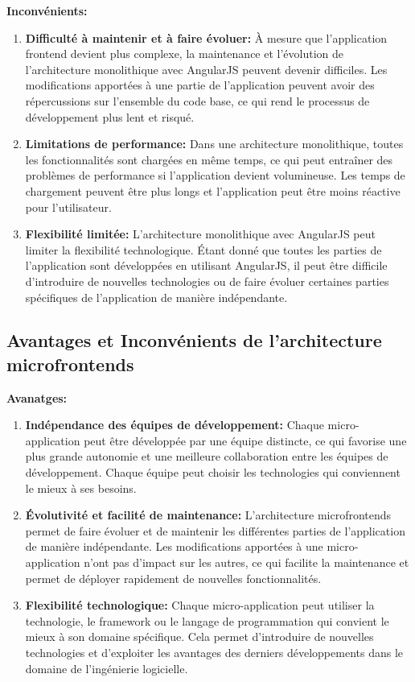 \textbf{Inconvénients:}
\begin{enumerate}
    \item \textbf{Difficulté à maintenir et à faire évoluer:} À mesure que l'application frontend devient plus complexe, la maintenance et l'évolution de l'architecture monolithique avec AngularJS peuvent devenir difficiles. Les modifications apportées à une partie de l'application peuvent avoir des répercussions sur l'ensemble du code base, ce qui rend le processus de développement plus lent et risqué.
    \item \textbf{Limitations de performance:} Dans une architecture monolithique, toutes les fonctionnalités sont chargées en même temps, ce qui peut entraîner des problèmes de performance si l'application devient volumineuse. Les temps de chargement peuvent être plus longs et l'application peut être moins réactive pour l'utilisateur.
    \item \textbf{Flexibilité limitée:} L'architecture monolithique avec AngularJS peut limiter la flexibilité technologique. Étant donné que toutes les parties de l'application sont développées en utilisant AngularJS, il peut être difficile d'introduire de nouvelles technologies ou de faire évoluer certaines parties spécifiques de l'application de manière indépendante.
\end{enumerate}

\subsection{Avantages et Inconvénients de l'architecture microfrontends}
\textbf{Avanatges:}
\begin{enumerate}
    \item \textbf{Indépendance des équipes de développement:} Chaque micro-application peut être développée par une équipe distincte, ce qui favorise une plus grande autonomie et une meilleure collaboration entre les équipes de développement. Chaque équipe peut choisir les technologies qui conviennent le mieux à ses besoins.
    \item \textbf{Évolutivité et facilité de maintenance:} L'architecture microfrontends permet de faire évoluer et de maintenir les différentes parties de l'application de manière indépendante. Les modifications apportées à une micro-application n'ont pas d'impact sur les autres, ce qui facilite la maintenance et permet de déployer rapidement de nouvelles fonctionnalités.
    \item \textbf{Flexibilité technologique:} Chaque micro-application peut utiliser la technologie, le framework ou le langage de programmation qui convient le mieux à son domaine spécifique. Cela permet d'introduire de nouvelles technologies et d'exploiter les avantages des derniers développements dans le domaine de l'ingénierie logicielle.
\end{enumerate}

